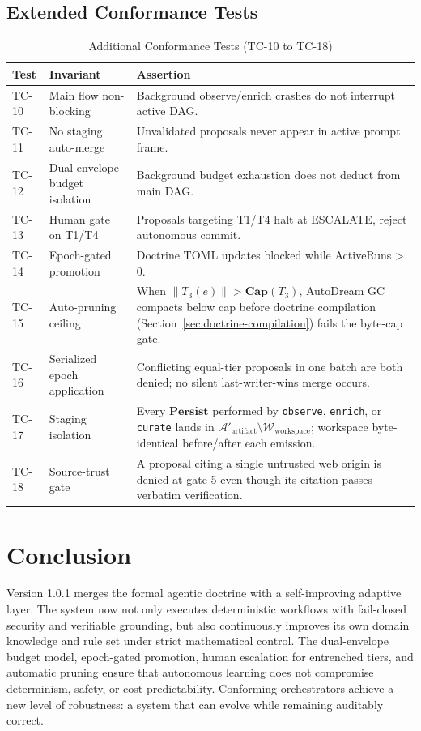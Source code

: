 \documentclass[11pt]{article}
\begin{document}
\subsection{Extended Conformance Tests}
\begin{table}[H]
\centering
\caption{Additional Conformance Tests (TC-10 to TC-18)}
\begin{tabular}{@{}lll@{}}
\toprule
\textbf{Test} & \textbf{Invariant} & \textbf{Assertion} \\
\midrule
TC-10 & Main flow non-blocking & Background observe/enrich crashes do not interrupt active DAG. \\
TC-11 & No staging auto-merge & Unvalidated proposals never appear in active prompt frame. \\
TC-12 & Dual-envelope budget isolation & Background budget exhaustion does not deduct from main DAG. \\
TC-13 & Human gate on T1/T4 & Proposals targeting T1/T4 halt at ESCALATE, reject autonomous commit. \\
TC-14 & Epoch-gated promotion & Doctrine TOML updates blocked while ActiveRuns > 0. \\
TC-15 & Auto-pruning ceiling & When $\|T_3(e)\| > \mathbf{Cap}(T_3)$, AutoDream GC compacts below cap before doctrine compilation (Section~\ref{sec:doctrine-compilation}) fails the byte-cap gate. \\
TC-16 & Serialized epoch application & Conflicting equal-tier proposals in one batch are both denied; no silent last-writer-wins merge occurs. \\
TC-17 & Staging isolation & Every $\mathbf{Persist}$ performed by \texttt{observe}, \texttt{enrich}, or \texttt{curate} lands in $\mathcal{A}'_{\text{artifact}} \setminus \mathcal{W}_{\text{workspace}}$; workspace byte-identical before/after each emission. \\
TC-18 & Source-trust gate & A proposal citing a single untrusted web origin is denied at gate 5 even though its citation passes verbatim verification. \\
\bottomrule
\end{tabular}
\end{table}

\section{Conclusion}
Version 1.0.1 merges the formal agentic doctrine with a self-improving adaptive layer. The system now not only executes deterministic workflows with fail-closed security and verifiable grounding, but also continuously improves its own domain knowledge and rule set under strict mathematical control. The dual-envelope budget model, epoch-gated promotion, human escalation for entrenched tiers, and automatic pruning ensure that autonomous learning does not compromise determinism, safety, or cost predictability. Conforming orchestrators achieve a new level of robustness: a system that can evolve while remaining auditably correct.
\end{document}

